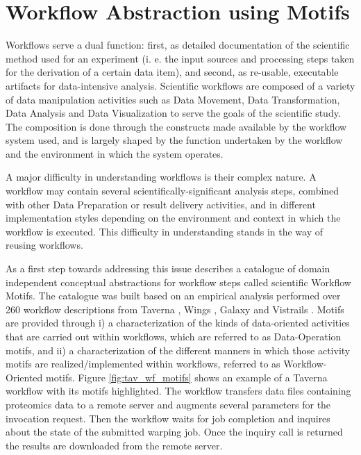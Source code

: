 \section{Workflow Abstraction using Motifs}
\label{sec:abstraction}
Workflows serve a dual function: first, as detailed documentation of the scientific method used for an experiment (i. e. the input sources and processing steps taken for the derivation of a certain data item), and second, as re-usable, executable artifacts for data-intensive analysis. 
Scientific workflows are composed of a variety of data manipulation activities such as Data Movement, Data Transformation, Data Analysis and Data Visualization to serve the goals of the scientific study. The composition is done through the constructs made available by the workflow system used, and is largely shaped by the function undertaken by the workflow and the environment in which the system operates.

A major difficulty in understanding workflows is their complex nature. A workflow may contain several scientifically-significant analysis steps, combined with other Data Preparation or result delivery activities, and in different implementation styles depending on the environment and context in which the workflow is executed. This difficulty in understanding stands in the way of reusing workflows.

As a first step towards addressing this issue \cite{garijo_Alper_2012} describes a catalogue of domain independent conceptual abstractions for workflow steps called scientific Workflow Motifs. The catalogue was built based on an empirical analysis performed over 260 workflow descriptions from Taverna \cite{taverna}, Wings \cite{DBLP:journals/expert/GilRKGGMD11}, Galaxy \cite{Goecks_Nekrutenko_Taylor_2010} and Vistrails \cite{Callahan06-vistrails}. Motifs are provided through i) a characterization of the kinds of data-oriented activities that are carried out within workflows, which are referred to as Data-Operation motifs, and ii) a characterization of the different manners in which those activity motifs are realized/implemented within workflows, referred to as Workflow-Oriented motifs. Figure \ref{fig:tav_wf_motifs} shows an example of a Taverna workflow with its motifs highlighted. The workflow transfers data files containing proteomics data to a remote server and  augments several parameters for the invocation request. Then the workflow waits for job completion and inquires about the state of the submitted warping job. Once the inquiry call is returned the results are downloaded from the remote server.

